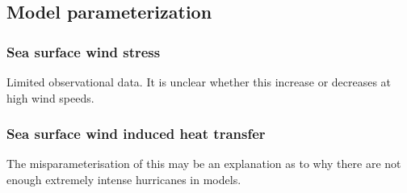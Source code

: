 \subsection{Model parameterization}
\subsubsection{Sea surface wind stress}
Limited observational data.
It is unclear whether this increase or decreases at high wind speeds.

\subsubsection{Sea surface wind induced heat transfer}
The misparameterisation of this may be an explanation as to why there are
not enough extremely intense hurricanes in models.
